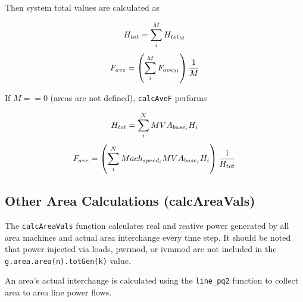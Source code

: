 Then system total values are calculated as

\begin{equation}{\label{eq: systemH} }
H_{tot} = \sum_{i}^{M} H_{tot_M}
\end{equation} 
\vspace{-1em}
\begin{equation}{\label{eq: systemF} }
F_{ave} = \left( \sum_{i}^{M} F_{ave_M} \right) \dfrac{1}{M}
\end{equation}
\vspace{0.5 em}

If $M==0$ (areas are not defined), \verb|calcAveF| performs

\begin{equation}{\label{eq: systemH2} }
H_{tot} = \sum_{i}^{N} MVA_{base_i}H_i 
\end{equation} 
\vspace{-1em}
\begin{equation}{\label{eq: systemF2} }
F_{ave} = \left( \sum_{i}^{N}Mach_{speed_i}MVA_{base_i}H_i \right) \dfrac{1}{H_{tot}}
\end{equation}\vspace{0.5 em}


\subsection{Other Area Calculations (calcAreaVals)}  
The \verb|calcAreaVals| function calculates real and reative power generated by all area machines and actual area interchange every time step.
It should be noted that power injected via loads, pwrmod, or ivmmod are not included in the \verb|g.area.area(n).totGen(k)| value.

An area's actual interchange is calculated using the \verb|line_pq2| function to collect area to area line power flows.

